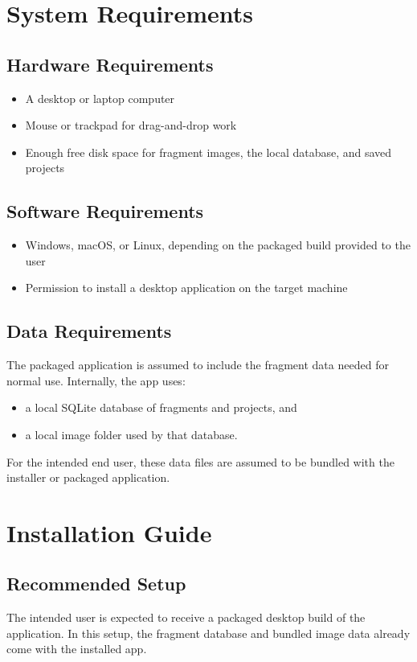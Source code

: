 \documentclass[12pt]{article}
\begin{document}
\section{System Requirements}

\subsection{Hardware Requirements}
\begin{itemize}
  \item A desktop or laptop computer
  \item Mouse or trackpad for drag-and-drop work
  \item Enough free disk space for fragment images, the local database, and saved projects
\end{itemize}

\subsection{Software Requirements}
\begin{itemize}
  \item Windows, macOS, or Linux, depending on the packaged build provided to the user
  \item Permission to install a desktop application on the target machine
\end{itemize}

\subsection{Data Requirements}
The packaged application is assumed to include the fragment data needed for normal use.
Internally, the app uses:
\begin{itemize}
  \item a local SQLite database of fragments and projects, and
  \item a local image folder used by that database.
\end{itemize}

For the intended end user, these data files are assumed to be bundled with the installer or packaged application.

\section{Installation Guide}

\subsection{Recommended Setup}
The intended user is expected to receive a packaged desktop build of the application.
In this setup, the fragment database and bundled image data already come with the installed app.
\end{document}
